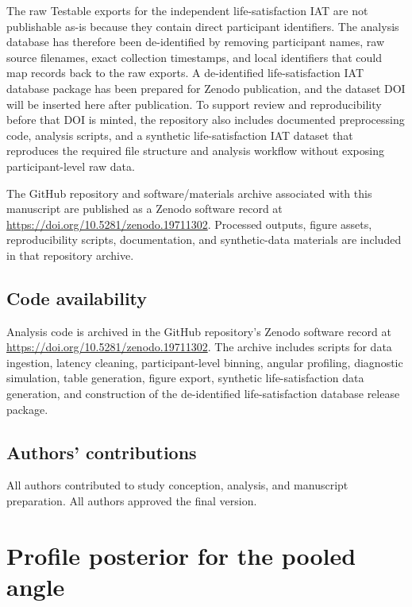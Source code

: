 \documentclass[12pt]{article}
\begin{document}
The raw Testable exports for the independent life-satisfaction IAT are not publishable as-is because they contain direct participant identifiers. The analysis database has therefore been de-identified by removing participant names, raw source filenames, exact collection timestamps, and local identifiers that could map records back to the raw exports. A de-identified life-satisfaction IAT database package has been prepared for Zenodo publication, and the dataset DOI will be inserted here after publication. To support review and reproducibility before that DOI is minted, the repository also includes documented preprocessing code, analysis scripts, and a synthetic life-satisfaction IAT dataset that reproduces the required file structure and analysis workflow without exposing participant-level raw data.

The GitHub repository and software/materials archive associated with this manuscript are published as a Zenodo software record at \url{https://doi.org/10.5281/zenodo.19711302}. Processed outputs, figure assets, reproducibility scripts, documentation, and synthetic-data materials are included in that repository archive.

\subsection*{Code availability}
Analysis code is archived in the GitHub repository's Zenodo software record at \url{https://doi.org/10.5281/zenodo.19711302}. The archive includes scripts for data ingestion, latency cleaning, participant-level binning, angular profiling, diagnostic simulation, table generation, figure export, synthetic life-satisfaction data generation, and construction of the de-identified life-satisfaction database release package.

\subsection*{Authors' contributions}
All authors contributed to study conception, analysis, and manuscript preparation. All authors approved the final version.

\appendix
\section{Profile posterior for the pooled angle}
\end{document}
